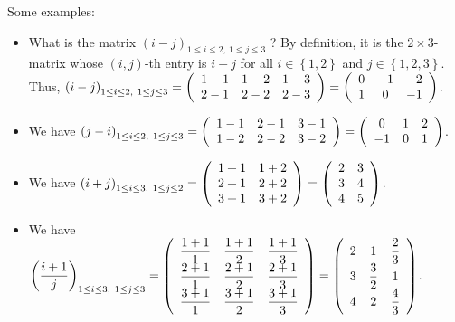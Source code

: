 \documentclass[numbers=enddot,12pt,final,onecolumn,notitlepage]{scrartcl}%
\theoremstyle{definition}
\begin{document}
Some examples:

\begin{itemize}
\item What is the matrix $\left(  i-j\right)  _{1\leq i\leq2,\ 1\leq j\leq3}$
? By definition, it is the $2\times3$-matrix whose $\left(  i,j\right)  $-th
entry is $i-j$ for all $i\in\left\{  1,2\right\}  $ and $j\in\left\{
1,2,3\right\}  $. Thus, $\left(  i-j\right)  _{1\leq i\leq2,\ 1\leq j\leq
3}=\left(
\begin{array}
[c]{ccc}%
1-1 & 1-2 & 1-3\\
2-1 & 2-2 & 2-3
\end{array}
\right)  =\left(
\begin{array}
[c]{ccc}%
0 & -1 & -2\\
1 & 0 & -1
\end{array}
\right)  $.

\item We have $\left(  j-i\right)  _{1\leq i\leq2,\ 1\leq j\leq3}=\left(
\begin{array}
[c]{ccc}%
1-1 & 2-1 & 3-1\\
1-2 & 2-2 & 3-2
\end{array}
\right)  =\left(
\begin{array}
[c]{ccc}%
0 & 1 & 2\\
-1 & 0 & 1
\end{array}
\right)  $.

\item We have $\left(  i+j\right)  _{1\leq i\leq3,\ 1\leq j\leq2}=\left(
\begin{array}
[c]{cc}%
1+1 & 1+2\\
2+1 & 2+2\\
3+1 & 3+2
\end{array}
\right)  =\left(
\begin{array}
[c]{cc}%
2 & 3\\
3 & 4\\
4 & 5
\end{array}
\right)  $.

\item We have $\left(  \dfrac{i+1}{j}\right)  _{1\leq i\leq3,\ 1\leq j\leq
3}=\left(
\begin{array}
[c]{ccc}%
\dfrac{1+1}{1} & \dfrac{1+1}{2} & \dfrac{1+1}{3}\\
\dfrac{2+1}{1} & \dfrac{2+1}{2} & \dfrac{2+1}{3}\\
\dfrac{3+1}{1} & \dfrac{3+1}{2} & \dfrac{3+1}{3}%
\end{array}
\right)  =\left(
\begin{array}
[c]{ccc}%
2 & 1 & \dfrac{2}{3}\\
3 & \dfrac{3}{2} & 1\\
4 & 2 & \dfrac{4}{3}%
\end{array}
\right)  $.


\end{itemize}
\end{document}

